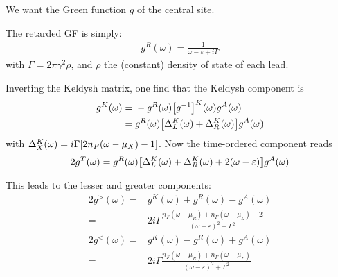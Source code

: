 \documentclass[12pt]{article}
\begin{document}
We want the Green function $g$ of the central site.

The retarded GF is simply:
\begin{eqnarray}
	g^R(\omega) = \frac{1}{\omega - \varepsilon + i\Gamma}
\end{eqnarray}
with $\Gamma = 2\pi\gamma^2\rho$, and $\rho$ the (constant) density of state of each lead.

Inverting the Keldysh matrix, one find that the Keldysh component is
\begin{align}
	g^K(\omega) ={}& - g^R(\omega) \qty[g^{-1}]^K(\omega) g^A(\omega)
	\\
	={}& g^R(\omega) \qty[\Delta^K_L(\omega) + \Delta^K_R(\omega)] g^A(\omega)
\end{align}
with $\Delta^K_X(\omega) = i\Gamma \qty[2 n_F(\omega - \mu_X) - 1]$.
Now the time-ordered component reads
\begin{equation}
	2g^T(\omega) = g^R(\omega) \qty[\Delta^K_L(\omega) + \Delta^K_R(\omega) + 2(\omega - \varepsilon)] g^A(\omega)
\end{equation}

%


This leads to the lesser and greater components:
\begin{align}
	2g^>(\omega) ={}& g^K(\omega) + g^R(\omega) - g^A(\omega)
	\\
	={}& 2i\Gamma \frac{n_F(\omega - \mu_R) + n_F(\omega - \mu_L) - 2}{(\omega - \varepsilon)^2 + \Gamma^2}
	\\
	2g^<(\omega) ={}& g^K(\omega) - g^R(\omega) + g^A(\omega)
	\\
	={}& 2i\Gamma \frac{n_F(\omega - \mu_R) + n_F(\omega - \mu_L)}{(\omega - \varepsilon)^2 + \Gamma^2}
\end{align}
\end{document}
